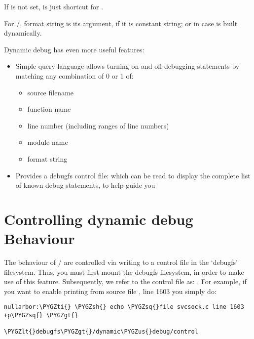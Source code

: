 \documentclass[a4paper,8pt,english]{sphinxmanual}
\def\PYGZus{\char`\_}
\def\PYGZlt{\char`\<}
\def\PYGZgt{\char`\>}
\def\PYGZsh{\char`\#}
\def\PYGZsq{\char`\'}
\def\PYGZti{\char`\~}
\renewcommand\PYGZsq{\textquotesingle}
\begin{document}
If  is not set,  is just
shortcut for .

For /, format string is
its  argument, if it is constant string; or 
in case  is built dynamically.

Dynamic debug has even more useful features:
\begin{itemize}
\item {} 
Simple query language allows turning on and off debugging
statements by matching any combination of 0 or 1 of:
\begin{itemize}
\item {} 
source filename

\item {} 
function name

\item {} 
line number (including ranges of line numbers)

\item {} 
module name

\item {} 
format string

\end{itemize}

\item {} 
Provides a debugfs control file: 
which can be read to display the complete list of known debug
statements, to help guide you

\end{itemize}


\section{Controlling dynamic debug Behaviour}
\label{admin-guide/dynamic-debug-howto:controlling-dynamic-debug-behaviour}
The behaviour of / are controlled via writing to a
control file in the `debugfs' filesystem. Thus, you must first mount
the debugfs filesystem, in order to make use of this feature.
Subsequently, we refer to the control file as:
. For example, if you want to enable
printing from source file , line 1603 you simply do:

\begin{Verbatim}[commandchars=\\\{\}]
nullarbor:\PYGZti{} \PYGZsh{} echo \PYGZsq{}file svcsock.c line 1603 +p\PYGZsq{} \PYGZgt{}
                              \PYGZlt{}debugfs\PYGZgt{}/dynamic\PYGZus{}debug/control
\end{Verbatim}
\end{document}
